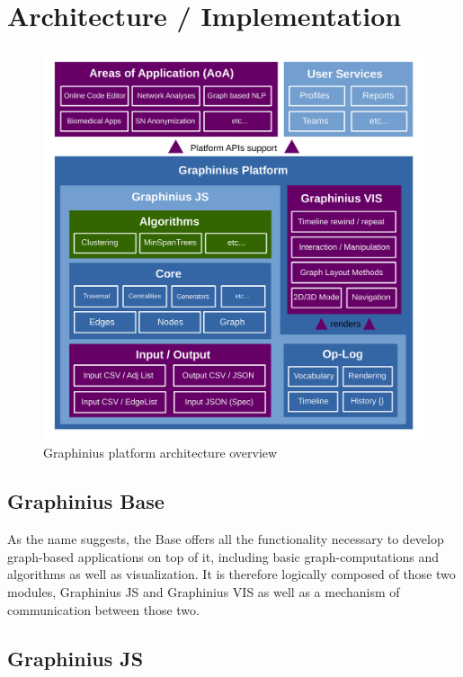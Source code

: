 \chapter{Architecture / Implementation}
\label{ch:implementation}

\begin{figure}[ht]
	\hspace*{-0.5cm}
	\includegraphics[width=1.1\textwidth]{figures/Graphinius_Architecture_pdf}
	\caption{Graphinius platform architecture overview}
	\label{fig_graphinius_architecture}
\end{figure}


\section{Graphinius Base}
\label{sect:graphinius_base}

As the name suggests, the Base offers all the functionality necessary to develop graph-based applications on top of it, including basic graph-computations and algorithms as well as visualization. It is therefore logically composed of those two modules, Graphinius JS and Graphinius VIS as well as a mechanism of communication between those two.


\section{Graphinius JS}
\label{sect:graphinius_js}

